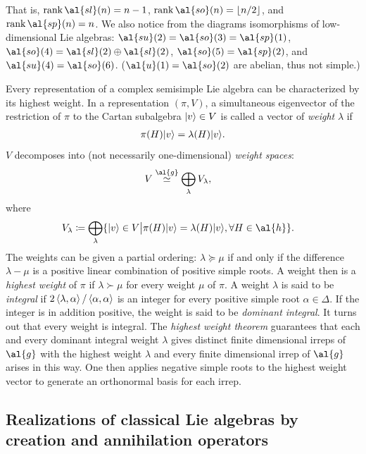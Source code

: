 \noindent That is, $ \ran \al{sl}(n) = n-1$, $\ran \al{so}(n) = \lfloor n/2 \rfloor$, and $\ran \al{sp}(n) = n$. We also notice from the diagrams isomorphisms of low-dimensional Lie algebras: $\al{su}(2) \allowbreak = \al{so}(3) = \al{sp}(1)$, $\al{so}(4) = \al{sl}(2) \oplus \al{sl}(2)$, $\al{so}(5) = \al{sp}(2)$, and $\al{su}(4) = \al{so}(6)$. ($\al{u}(1) = \al{so}(2)$ are abelian, thus not simple.)

Every representation of a complex semisimple Lie algebra can be characterized by its highest weight. In a representation $(\pi,V)$, a simultaneous eigenvector of the restriction of $\pi$ to the Cartan subalgebra ${\left\vert{v}\right\rangle} \in V$ is called a vector of \emph{weight} $\lambda$ if
\begin{align}
\pi(H) {\left\vert{v}\right\rangle} = \lambda(H) {\left\vert{v}\right\rangle}.
\end{align}
$V$ decomposes into (not necessarily one-dimensional) \emph{weight spaces}:
\begin{align}
V &\stackrel{\al{g}}{\simeq}  \bigoplus_{\lambda}V_{\lambda},
\end{align}
where
\begin{align}
	V_{\lambda}
	&\coloneqq \bigoplus_{\lambda} \{ \ket{v} \in V \big| \pi(H) \ket{v} = \lambda(H) \ket{v}, \forall H \in \al{h} \}.
\end{align}
The weights can be given a partial ordering: $\lambda \succeq \mu$ if and only if the difference $\lambda - \mu$ is a positive linear combination of positive simple roots. A weight then is a \emph{highest weight} of $\pi$ if $\lambda \succ \mu$ for every weight $\mu$ of $\pi$. A weight $\lambda$ is said to be \emph{integral} if $2\braket{\lambda,\alpha}/\braket{\alpha,\alpha}$ is an integer for every positive simple root $\alpha \in \Delta$. If the integer is in addition positive, the weight is said to be \emph{dominant integral}. It turns out that every weight is integral. The \emph{highest weight theorem} guarantees that each and every dominant integral weight $\lambda$ gives distinct finite dimensional irreps of $\al{g}$ with the highest weight $\lambda$ and every finite dimensional irrep of $\al{g}$ arises in this way. One then applies negative simple roots to the highest weight vector to generate an orthonormal basis for each irrep.

\subsection{Realizations of classical Lie algebras by creation and annihilation operators}\label{ch2:physics-realization}

